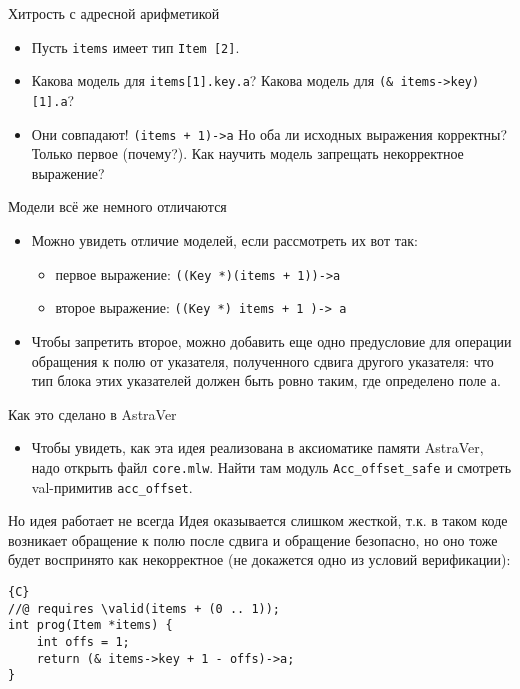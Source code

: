 \documentclass[hyperref={unicode=true}]{beamer}
\begin{document}
    \begin{frame}{Хитрость с адресной арифметикой}
    \begin{itemize}
    \item
    Пусть \texttt{items} имеет тип \texttt{Item [2]}.
    \item
    Какова модель для \texttt{items[1].key.a}?
    Какова модель для \texttt{(\& items->key)[1].a}?
    \item
    Они совпадают! \texttt{(items + 1)->a}
    Но оба ли исходных выражения корректны? Только первое
    (почему?).
    Как научить модель запрещать некорректное выражение?
    \end{itemize}
    \end{frame}

    \begin{frame}{Модели всё же немного отличаются}
    \begin{itemize}
    \item
    Можно увидеть отличие моделей, если рассмотреть их
    вот так:
        \begin{itemize}
        \item первое выражение: \texttt{((Key *)(items + 1))->a}
        \item второе выражение: \texttt{((Key *) items + 1 )-> a}
        \end{itemize}
    \item
    Чтобы запретить второе, можно добавить еще одно предусловие
    для операции обращения к полю от указателя, полученного
    сдвига другого указателя: что тип блока этих указателей
    должен быть ровно таким, где определено поле а.
    \end{itemize}
    \end{frame}

    \begin{frame}{Как это сделано в AstraVer}
    \begin{itemize}
    \item
    Чтобы увидеть, как эта идея реализована в аксиоматике памяти
    AstraVer, надо открыть файл \texttt{core.mlw}. Найти там
    модуль \texttt{Acc\_offset\_safe} и смотреть val-примитив
    \texttt{acc\_offset}.
    \end{itemize}
    \end{frame}

    \begin{frame}[fragile]{Но идея работает не всегда}
    Идея оказывается слишком жесткой, т.к. в таком коде возникает
    обращение к полю после сдвига и обращение безопасно, но оно
    тоже будет воспринято как некорректное (не докажется одно из
    условий верификации):
    \begin{lstlisting}{C}
//@ requires \valid(items + (0 .. 1));
int prog(Item *items) {
    int offs = 1;
    return (& items->key + 1 - offs)->a;
}
    \end{lstlisting}
    \end{frame}
\end{document}
